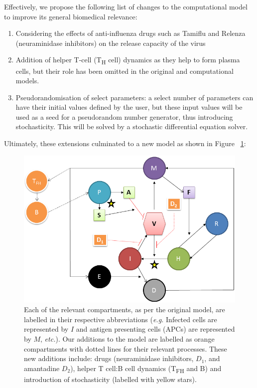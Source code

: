 \documentclass[a4paper, 12pt]{report}
\begin{document}
Effectively, we propose the following list of changes to the computational model to improve its general biomedical relevance:
\begin{enumerate}
\item Considering the effects of anti-influenza drugs such as Tamiflu and Relenza (neuraminidase inhibitors) on the release capacity of the virus
\item Addition of helper T-cell (T\textsubscript{H} cell) dynamics as they help to form plasma cells, but their role has been omitted in the original and computational models.
\item Pseudorandomisation of select parameters: a select number of parameters can have their initial values defined by the user, but these input values will be used as a seed for a pseudorandom number generator, thus introducing stochasticity. This will be solved by a stochastic differential equation solver.\\
\end{enumerate}

Ultimately, these extensions culminated to a new model as shown in Figure ~\ref{newmodel}:

\begin{figure}[htb]
\label{newmodel}
\includegraphics[width = 150mm]{Diagram.png}
\caption{Each of the relevant compartments, as per the original model, are labelled in their respective abbreviations (\emph{e.g.} Infected cells are represented by $I$ and antigen presenting cells (APCs) are represented by $M$, \emph{etc.}). Our additions to the model are labelled as orange compartments with dotted lines for their relevant processes. These new additions include: drugs (neuraminidase inhibitors, $D_1$, and amantadine $D_2$), helper T cell:B cell dynamics (T\textsubscript{FH} and B) and introduction of stochasticity (labelled with yellow stars).}
\end{figure}
\end{document}
